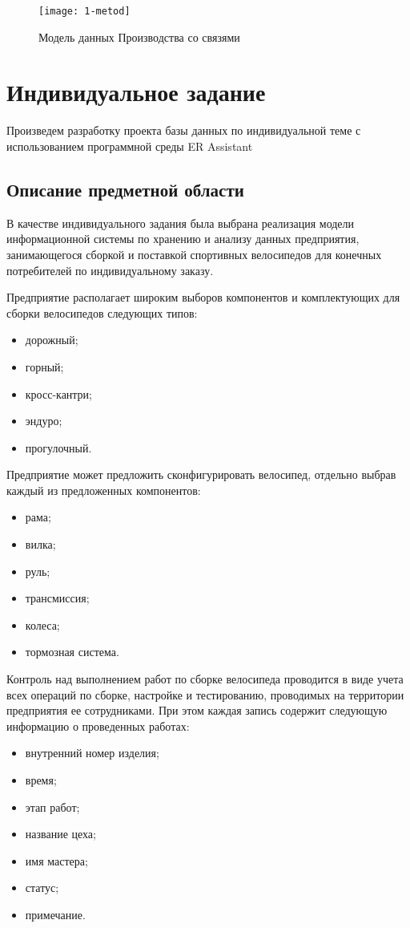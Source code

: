 \begin{figure}[ht]
	\centering
	\texttt{[image: 1-metod]}
	\caption{Модель данных Производства со связями}
	\label{fig:1-metod}
\end{figure}
\section{Индивидуальное задание}
Произведем разработку проекта базы данных по индивидуальной теме с использованием программной среды ER Assistant
\subsection{Описание предметной области}
В качестве индивидуального задания была выбрана реализация модели информационной системы по хранению и анализу данных  предприятия, занимающегося сборкой и поставкой спортивных велосипедов для конечных потребителей по индивидуальному заказу.

Предприятие располагает широким выборов компонентов и комплектующих для сборки велосипедов следующих типов:
\begin{itemize}
	\item дорожный;
	\item горный;
	\item кросс-кантри;
	\item эндуро;
	\item прогулочный.
\end{itemize}

Предприятие может предложить сконфигурировать велосипед, отдельно выбрав каждый из предложенных компонентов:
\begin{itemize}
	\item рама;
	\item вилка;
	\item руль;
	\item трансмиссия;
	\item колеса;
	\item тормозная система.
\end{itemize}

Контроль над выполнением работ по сборке велосипеда проводится в виде учета всех операций по сборке, настройке и тестированию, проводимых на территории предприятия ее сотрудниками. При этом каждая запись содержит следующую информацию о проведенных работах:
\begin{itemize}
	\item внутренний номер изделия;
	\item время;
	\item этап работ;
	\item название цеха;
	\item имя мастера;
	\item статус;
	\item примечание.
\end{itemize}

